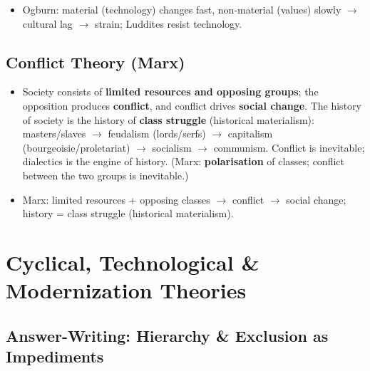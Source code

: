 \begin{QuickRevision}
\begin{itemize}
    \item Ogburn: material (technology) changes fast, non-material (values) slowly $\rightarrow$ cultural lag $\rightarrow$ strain; Luddites resist technology.
\end{itemize}
\end{QuickRevision}

\sectiondivider

\subsection{Conflict Theory (Marx)}

\begin{KeyConcept}
\begin{itemize}
    \item Society consists of \textbf{limited resources and opposing groups}; the opposition produces \textbf{conflict}, and conflict drives \textbf{social change}. The history of society is the history of \textbf{class struggle} (historical materialism): masters/slaves $\rightarrow$ feudalism (lords/serfs) $\rightarrow$ capitalism (bourgeoisie/proletariat) $\rightarrow$ socialism $\rightarrow$ communism. Conflict is inevitable; dialectics is the engine of history. (Marx: \textbf{polarisation} of classes; conflict between the two groups is inevitable.)
\end{itemize}
\end{KeyConcept}

\begin{QuickRevision}
\begin{itemize}
    \item Marx: limited resources + opposing classes $\rightarrow$ conflict $\rightarrow$ social change; history = class struggle (historical materialism).
\end{itemize}
\end{QuickRevision}

\sectiondivider

\section{Cyclical, Technological \& Modernization Theories}

\subsection{Answer-Writing: Hierarchy \& Exclusion as Impediments}

